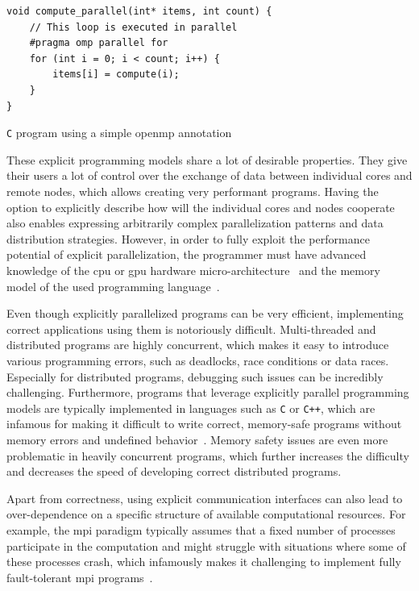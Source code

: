 \begin{description}[wide=0pt]
		\begin{listing}
			\begin{verbatim}
void compute_parallel(int* items, int count) {
	// This loop is executed in parallel
	#pragma omp parallel for
	for (int i = 0; i < count; i++) {
		items[i] = compute(i);
	}
}
        	\end{verbatim}
			\caption{\texttt{C} program using a simple \acrshort{openmp} annotation}
			\label{lst:openmp-annotation}
		\end{listing}
\end{description}

These explicit programming models share a lot of desirable properties. They give their users a lot
of control over the exchange of data between individual cores and remote nodes, which allows
creating very performant programs. Having the option to explicitly describe how will the individual
cores and nodes cooperate also enables expressing arbitrarily complex parallelization patterns and
data distribution strategies. However, in order to fully exploit the performance potential of
explicit parallelization, the programmer must have advanced knowledge of the \gls{cpu}
or \gls{gpu} hardware micro-architecture~\cite{intel_developer_manual} and the memory model
of the used programming language~\cite{cpp11_standard}.

Even though explicitly parallelized programs can be very efficient, implementing correct
applications using them is notoriously difficult. Multi-threaded and distributed programs are
highly concurrent, which makes it easy to introduce various programming errors, such as deadlocks,
race conditions or data races. Especially for distributed programs, debugging such issues can be
incredibly challenging. Furthermore, programs that leverage explicitly parallel programming models
are typically implemented in languages such as \texttt{C} or \texttt{C++},
which are infamous for making it difficult to write correct, memory-safe programs without memory
errors and undefined behavior~\cite{memory_safety_report}. Memory safety issues are even more
problematic in heavily concurrent programs, which further increases the difficulty and decreases
the speed of developing correct distributed programs.

Apart from correctness, using explicit communication interfaces can also lead to over-dependence on
a specific structure of available computational resources. For example, the \gls{mpi}
paradigm typically assumes that a fixed number of processes participate in the computation and
might struggle with situations where some of these processes crash, which infamously makes it
challenging to implement fully fault-tolerant \gls{mpi}
programs~\cite{fault_tolerant_mpi}.


